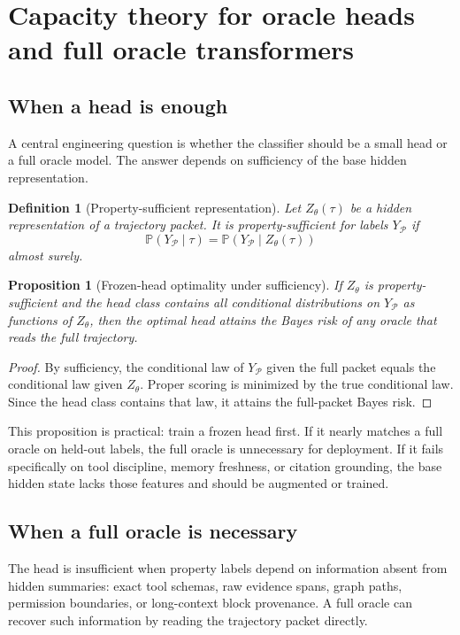 \documentclass[11pt]{article}
\newtheorem{proposition}[theorem]{Proposition}
\newtheorem{definition}[theorem]{Definition}
\newcommand{\calP}{\mathcal{P}}
\numberwithin{equation}{section}
\begin{document}
\section{Capacity theory for oracle heads and full oracle transformers}
\subsection{When a head is enough}
A central engineering question is whether the classifier should be a small head or a full oracle model. The answer depends on sufficiency of the base hidden representation.

\begin{definition}[Property-sufficient representation]
Let $Z_\theta(\tau)$ be a hidden representation of a trajectory packet. It is property-sufficient for labels $Y_\calP$ if
\begin{equation}
\mathbb{P}(Y_\calP\mid \tau)=\mathbb{P}(Y_\calP\mid Z_\theta(\tau))
\end{equation}
almost surely.
\end{definition}

\begin{proposition}[Frozen-head optimality under sufficiency]
If $Z_\theta$ is property-sufficient and the head class contains all conditional distributions on $Y_\calP$ as functions of $Z_\theta$, then the optimal head attains the Bayes risk of any oracle that reads the full trajectory.
\end{proposition}
\begin{proof}
By sufficiency, the conditional law of $Y_\calP$ given the full packet equals the conditional law given $Z_\theta$. Proper scoring is minimized by the true conditional law. Since the head class contains that law, it attains the full-packet Bayes risk.
\end{proof}

This proposition is practical: train a frozen head first. If it nearly matches a full oracle on held-out labels, the full oracle is unnecessary for deployment. If it fails specifically on tool discipline, memory freshness, or citation grounding, the base hidden state lacks those features and should be augmented or trained.

\subsection{When a full oracle is necessary}
The head is insufficient when property labels depend on information absent from hidden summaries: exact tool schemas, raw evidence spans, graph paths, permission boundaries, or long-context block provenance. A full oracle can recover such information by reading the trajectory packet directly.
\end{document}
